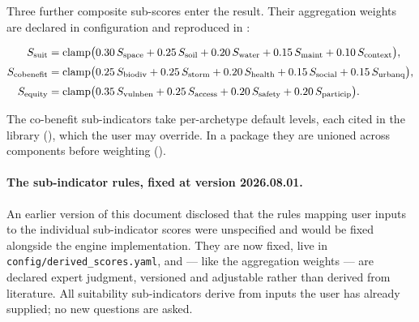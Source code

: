 Three further composite sub-scores enter the result. Their aggregation weights
are declared in configuration and reproduced in :

\begin{align}
\label{eq:suitability}
S_{\mathrm{suit}} &= \operatorname{clamp}\bigl(
  0.30\,S_{\mathrm{space}} + 0.25\,S_{\mathrm{soil}} + 0.20\,S_{\mathrm{water}}
+ 0.15\,S_{\mathrm{maint}} + 0.10\,S_{\mathrm{context}}\bigr), \\[2pt]
\label{eq:cobenefit}
S_{\mathrm{cobenefit}} &= \operatorname{clamp}\bigl(
  0.25\,S_{\mathrm{biodiv}} + 0.25\,S_{\mathrm{storm}} + 0.20\,S_{\mathrm{health}}
+ 0.15\,S_{\mathrm{social}} + 0.15\,S_{\mathrm{urbanq}}\bigr), \\[2pt]
\label{eq:equity}
S_{\mathrm{equity}} &= \operatorname{clamp}\bigl(
  0.35\,S_{\mathrm{vulnben}} + 0.25\,S_{\mathrm{access}} + 0.20\,S_{\mathrm{safety}}
+ 0.20\,S_{\mathrm{particip}}\bigr).
\end{align}

The co-benefit sub-indicators take per-archetype default levels, each cited in
the library (), which the user may override. In a package
they are unioned across components before weighting ().

\paragraph{The sub-indicator rules, fixed at version 2026.08.01.} An earlier
version of this document disclosed that the rules mapping user inputs to the
individual sub-indicator scores were unspecified and would be fixed alongside
the engine implementation. They are now fixed, live in
\texttt{config/derived\_scores.yaml}, and --- like the aggregation weights ---
are declared expert judgment, versioned and adjustable rather than derived from
literature. All suitability sub-indicators derive from inputs the user has
already supplied; no new questions are asked.

